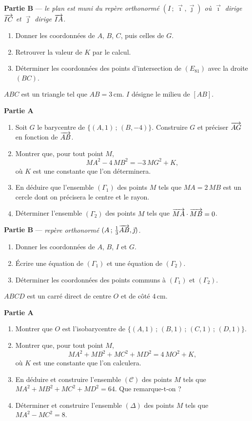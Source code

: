 \textbf{Partie B} — \textit{le plan est muni du repère orthonormé
$(I\,;\,\vec{\imath},\vec{\jmath})$ où $\vec{\imath}$ dirige $\overrightarrow{IC}$ et
$\vec{\jmath}$ dirige $\overrightarrow{IA}$.}
\begin{enumerate}
	\item Donner les coordonnées de $A$, $B$, $C$, puis celles de $G$.
	\item Retrouver la valeur de $K$ par le calcul.
	\item Déterminer les coordonnées des points d'intersection de $(E_{81})$
	avec la droite $(BC)$.
\end{enumerate}

$ABC$ est un triangle tel que $AB = 3\,$cm. $I$ désigne le milieu de $[AB]$.

\textbf{Partie A}
\begin{enumerate}
	\item Soit $G$ le barycentre de $\{(A,1)\,;\,(B,-4)\}$. Construire $G$ et
	préciser $\overrightarrow{AG}$ en fonction de $\overrightarrow{AB}$.
	\item Montrer que, pour tout point $M$,
	$$
	MA^2 - 4\,MB^2 = -3\,MG^2 + K,
	$$
	où $K$ est une constante que l'on déterminera.
	\item En déduire que l'ensemble $(\Gamma_1)$ des points $M$ tels que
	$MA = 2\,MB$ est un cercle dont on précisera le centre et le rayon.
	\item Déterminer l'ensemble $(\Gamma_2)$ des points $M$ tels que
	$\overrightarrow{MA}\cdot\overrightarrow{MB} = 0$.
\end{enumerate}

\textbf{Partie B} — \textit{repère orthonormé $(A\,;\,\frac13\overrightarrow{AB},\vec{\jmath})$.}
\begin{enumerate}
	\item Donner les coordonnées de $A$, $B$, $I$ et $G$.
	\item Écrire une équation de $(\Gamma_1)$ et une équation de $(\Gamma_2)$.
	\item Déterminer les coordonnées des points communs à $(\Gamma_1)$ et
	$(\Gamma_2)$.
\end{enumerate}

$ABCD$ est un carré direct de centre $O$ et de côté $4\,$cm.

\textbf{Partie A}
\begin{enumerate}
	\item Montrer que $O$ est l'isobarycentre de $\{(A,1)\,;\,(B,1)\,;\,(C,1)\,;\,(D,1)\}$.
	\item Montrer que, pour tout point $M$,
	$$
	MA^2 + MB^2 + MC^2 + MD^2 = 4\,MO^2 + K,
	$$
	où $K$ est une constante que l'on calculera.
	\item En déduire et construire l'ensemble $(\mathscr{C})$ des points $M$
	tels que $MA^2 + MB^2 + MC^2 + MD^2 = 64$. Que remarque-t-on ?
	\item Déterminer et construire l'ensemble $(\Delta)$ des points $M$ tels
	que $MA^2 - MC^2 = 8$.
\end{enumerate}

